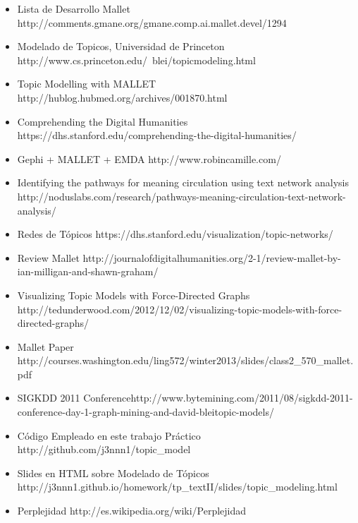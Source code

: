 \documentclass[8.5pt,twoside,twocolumn]{article}
\begin{document}
\begin{itemize}
\item{Lista de Desarrollo Mallet} http://comments.gmane.org/gmane.comp.ai.mallet.devel/1294
\item{Modelado de Topicos, Universidad de Princeton} http://www.cs.princeton.edu/~blei/topicmodeling.html
\item{Topic Modelling with MALLET} http://hublog.hubmed.org/archives/001870.html
\item{Comprehending the Digital Humanities} https://dhs.stanford.edu/comprehending-the-digital-humanities/
\item{Gephi + MALLET + EMDA} http://www.robincamille.com/
\item{Identifying the pathways for meaning circulation using text network analysis} http://noduslabs.com/research/pathways-meaning-circulation-text-network-analysis/ 
\item{Redes de T\'opicos} https://dhs.stanford.edu/visualization/topic-networks/
\item{Review Mallet} http://journalofdigitalhumanities.org/2-1/review-mallet-by-ian-milligan-and-shawn-graham/
\item{Visualizing Topic Models with Force-Directed Graphs} http://tedunderwood.com/2012/12/02/visualizing-topic-models-with-force-directed-graphs/
\item{Mallet Paper} http://courses.washington.edu/ling572/winter2013/slides/class2\_570\_mallet.pdf
\item{SIGKDD 2011 Conference}http://www.bytemining.com/2011/08/sigkdd-2011-conference-day-1-graph-mining-and-david-bleitopic-models/
\item{C\'odigo Empleado en este trabajo Pr\'actico} http://github.com/j3nnn1/topic\_model
\item{Slides en HTML sobre Modelado de T\'opicos} http://j3nnn1.github.io/homework/tp\_textII/slides/topic\_modeling.html
\item{Perplejidad } http://es.wikipedia.org/wiki/Perplejidad

\end{itemize}

\footnotesize{
}
\end{document}

